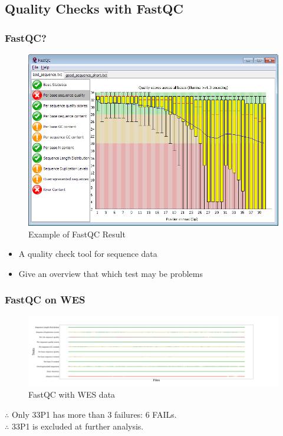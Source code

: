 \documentclass{beamer}
\begin{document}
    \subsection{Quality Checks with FastQC}
    \begin{frame}
        \frametitle{FastQC?}

        \begin{figure}
            \includegraphics[width=0.5 \linewidth]{figures/FastQC/example.png}
            \caption{Example of FastQC Result \protect\cite{fastqc1}}
        \end{figure}

        \begin{itemize}
            \item A quality check tool for sequence data
            \item Give an overview that which test may be problems
        \end{itemize}
    \end{frame}

    \begin{frame}
        \frametitle{FastQC on WES}

        \begin{figure}
            \includegraphics[width=\linewidth]{figures/FastQC/FastQC_WES.pdf}
            \caption{FastQC with WES data}
        \end{figure}

        $\therefore$ Only 33P1 has more than 3 failures: 6 FAILs. \\
        $\therefore$ 33P1 is excluded at further analysis.
    \end{frame}
\end{document}
